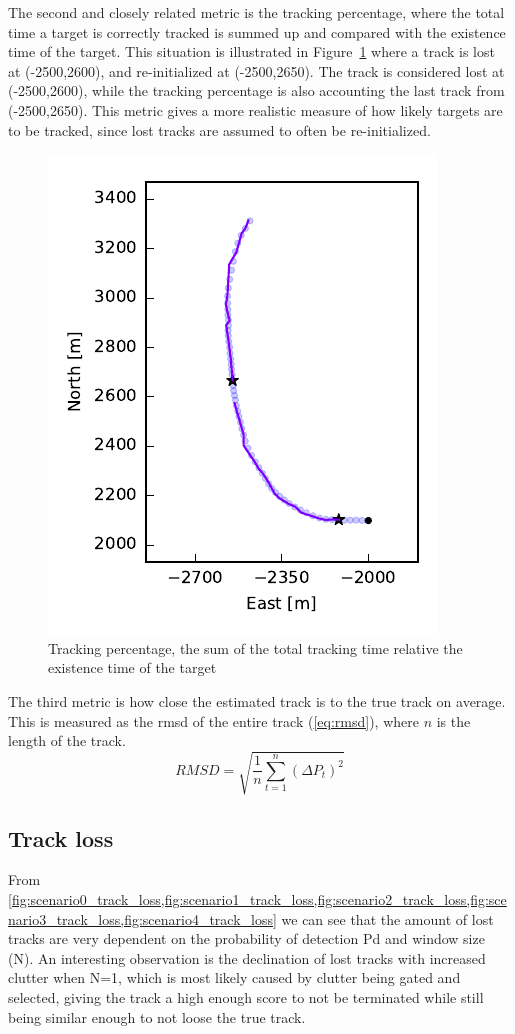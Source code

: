 The second and closely related metric is the tracking percentage, where the total time a target is correctly tracked is summed up and compared with the existence time of the target. This situation is illustrated in Figure~\ref{fig:track_percentage} where a track is lost at (-2500,2600), and re-initialized at (-2500,2650). The track is considered lost at (-2500,2600), while the tracking percentage is also accounting the last track from (-2500,2650). This metric gives a more realistic measure of how likely targets are to be tracked, since lost tracks are assumed to often be re-initialized. 
\begin{figure}[H]
\centering
\includegraphics{Figures/plots/TrackingPercentageExample.pdf}
\caption{Tracking percentage, the sum of the total tracking time relative the existence time of the target}\label{fig:track_percentage}
\end{figure}

The third metric is how close the estimated track is to the true track on average. This is measured as the \gls{rmsd} of the entire track (\ref{eq:rmsd}), where \(n\) is the length of the track.
\begin{equation}\label{eq:rmsd}
RMSD = \sqrt{\frac{1}{n}\sum_{t=1}^{n}{(\Delta P_t)}^2}
\end{equation}



\subsection{Track loss}
From \cref{fig:scenario0_track_loss,fig:scenario1_track_loss,fig:scenario2_track_loss,fig:scenario3_track_loss,fig:scenario4_track_loss} we can see that the amount of lost tracks are very dependent on the probability of detection \gls{Pd} and window size (N). An interesting observation is the declination of lost tracks with increased clutter when N=1, which is most likely caused by clutter being gated and selected, giving the track a high enough score to not be terminated while still being similar enough to not loose the true track.

